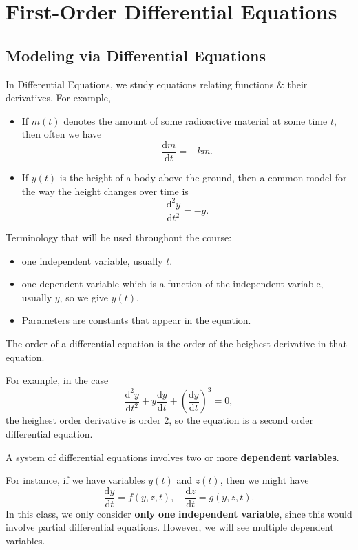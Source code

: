 \chapter{First-Order Differential Equations}
\section{Modeling via Differential Equations}
In Differential Equations, we study equations relating functions \& their derivatives. For example,
\begin{itemize}
	\item If $m(t)$ denotes the amount of some radioactive material at some time $t$, then often we have
		\[
			\frac{\mathrm{d}m}{\mathrm{d}t} =-km
		.\]
	\item If $y(t)$ is the height of a body above the ground, then a common model for the way the height changes over time is
		\[
			\frac{\mathrm{d} ^2 y}{\mathrm{d} t^2}=-g
		.\]
\end{itemize}

\begin{notation}
	Terminology that will be used throughout the course:
	\begin{itemize}
		\item one independent variable, usually $t$.
		\item one dependent variable which is a function of the independent variable, usually $y$, so we give $y(t)$.
		\item Parameters are constants that appear in the equation.
	\end{itemize}
\end{notation}

\begin{definition}\label{dfn:1}
	The order of a differential equation is the order of the heighest derivative in that equation.
\end{definition}

For example, in the case
\[
	\frac{\mathrm{d}^2y}{\mathrm{d}t^2} +y \frac{\mathrm{d}y}{\mathrm{d}t} +\left( \frac{\mathrm{d}y}{\mathrm{d}t}  \right)^3 = 0 
,\]
the heighest order derivative is order 2, so the equation is a second order differential equation.

\begin{definition}\label{dfn:2}
	A system of differential equations involves two or more \textbf{dependent} \textbf{variables}.
\end{definition}
For instance, if we have variables $y(t)$ and $z(t)$, then we might have
\[
	\frac{\mathrm{d}y}{\mathrm{d}t} =f(y,z,t),\quad \frac{\mathrm{d}z}{\mathrm{d}t} =g(y,z,t)
.\]
In this class, we only consider \textbf{only} \textbf{one} \textbf{independent} \textbf{variable}, since this would involve partial differential equations. However, we will see multiple dependent variables.

